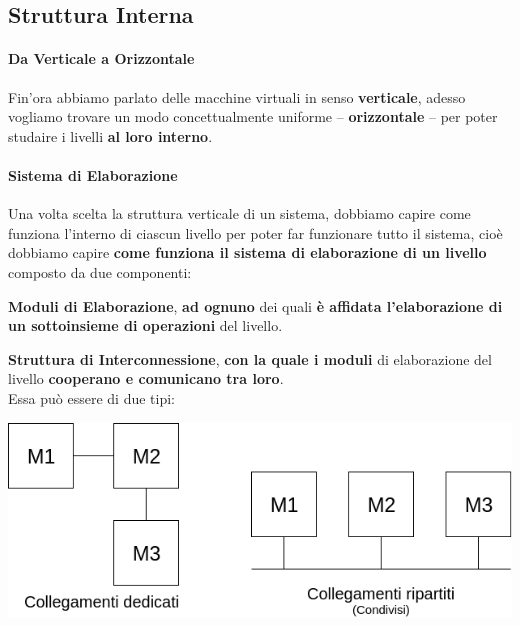 \documentclass[10pt]{report}
\begin{document}
\subsection{Struttura Interna}
\paragraph{Da Verticale a Orizzontale} Fin'ora abbiamo parlato delle macchine virtuali in senso \textbf{verticale}, adesso vogliamo trovare un modo concettualmente uniforme -- \textbf{orizzontale} -- per poter studaire i livelli \textbf{al loro interno}.
\paragraph{Sistema di Elaborazione} Una volta scelta la struttura verticale di un sistema, dobbiamo capire come funziona l'interno di ciascun livello per poter far funzionare tutto il sistema, cioè dobbiamo capire \textbf{come funziona il sistema di elaborazione di un livello} composto da due componenti:
\begin{list}{}{}
	\item \textbf{Moduli di Elaborazione}, \textbf{ad ognuno} dei quali \textbf{è affidata l'elaborazione di un sottoinsieme di operazioni} del livello.
	\item \textbf{Struttura di Interconnessione}, \textbf{con la quale i moduli} di elaborazione del livello \textbf{cooperano e comunicano tra loro}.\\
	Essa può essere di due tipi:
\end{list}
\begin{center}
\includegraphics[scale=0.6]{strutturainterna.png}
\end{center}
\end{document}
